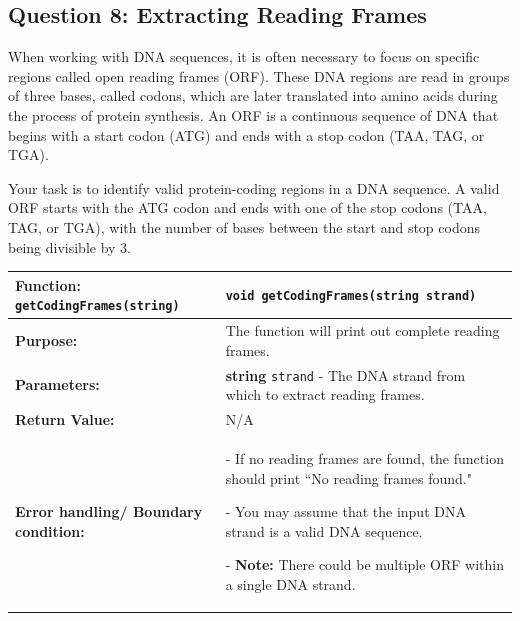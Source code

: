 \subsection{Question 8: Extracting Reading Frames}


When working with DNA sequences, it is often necessary to focus on specific regions called open reading frames (ORF). These DNA regions are read in groups of three bases, called codons, which are later translated into amino acids during the process of protein synthesis. An ORF is a continuous sequence of DNA that begins with a start codon (ATG) and ends with a stop codon (TAA, TAG, or TGA).  

\hspace{0pt}

Your task is to identify valid protein-coding regions in a DNA sequence. A valid ORF starts with the ATG codon and ends with one of the stop codons (TAA, TAG, or TGA), with the number of bases between the start and stop codons being divisible by 3.


\begin{longtable}{|p{1.7in}|p{4.0in}|}
    \hline
    \textbf{Function:} \texttt{getCodingFrames(string)}
        & 
        \texttt{void getCodingFrames(string strand)} 
        \\ \hline
    
    \textbf{Purpose:} 
        & 
        The function will print out complete reading frames.
        \\ \hline
    
    \textbf{Parameters:} 
        & 
        \textbf{string} \texttt{strand} - The DNA strand from which to extract reading frames.
        \\ \hline
    
    \textbf{Return Value:} 
        & 
        N/A
        \\ \hline
    \textbf{Error handling/ Boundary condition:}
        &
        - If no reading frames are found, the function should print ``No reading frames found."
        
        - You may assume that the input DNA strand is a valid DNA sequence.

        - \textbf{Note: }There could be multiple ORF within a single DNA strand. 
        
    \\ \hline
\end{longtable}

